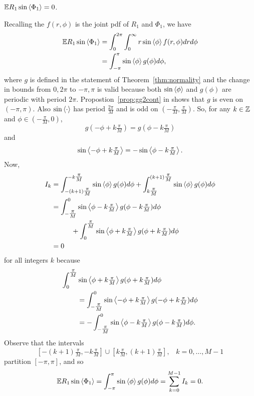 \documentclass[journal]{IEEEtran}
\begin{document}
\begin{lemma}\label{lem:expectImRfracpart}
${\mathbb E} R_1 \sin\left\langle \Phi_1 \right\rangle = 0$.
\end{lemma}
\begin{IEEEproof}
Recalling the $f(r,\phi)$ is the joint pdf of $R_1$ and $\Phi_1$, we have
\begin{align*}
{\mathbb E} R_1 \sin\left\langle \Phi_1 \right\rangle &= \int_{0}^{2\pi} \int_{0}^\infty r \sin\left\langle \phi \right\rangle f(r,\phi) dr d\phi \\
&= \int_{-\pi}^{\pi} \sin\left\langle \phi \right\rangle g(\phi) d\phi,
\end{align*}
where $g$ is defined in the statement of Theorem~\ref{thm:normality} and the change in bounds from $0, 2\pi$ to $-\pi,\pi$ is valid because both $\sin\left\langle \phi \right\rangle$ and $g(\phi)$ are periodic with period $2\pi$.  Propostion~\ref{prop:gg2cont} in \cite{McKilliam_leastsqPSKpilotsdata_2012} shows that $g$ is even on $(-\pi,\pi)$.  Also $\sin\left\langle \cdot \right\rangle$ has period $\tfrac{2\pi}{M}$ and is odd on $(-\frac{\pi}{M}, \tfrac{\pi}{M})$.  So, for any $k \in {\mathbb Z}$ and $\phi \in (-\tfrac{\pi}{M}, 0)$,
\[
g(-\phi + k \tfrac{\pi}{M}) = g(\phi - k \tfrac{\pi}{M})
\]
and
\[
\sin\left\langle -\phi + k \tfrac{\pi}{M} \right\rangle = -\sin\left\langle \phi - k \tfrac{\pi}{M} \right\rangle.
\]
Now,
\begin{align*}
I_k &= \int_{-(k+1)\tfrac{\pi}{M}}^{-k\tfrac{\pi}{M}}\sin\left\langle \phi \right\rangle g(\phi) d\phi + \int_{k\tfrac{\pi}{M}}^{(k+1)\tfrac{\pi}{M}}\sin\left\langle \phi \right\rangle g(\phi) d\phi \\
&= \int_{-\tfrac{\pi}{M}}^{0}\sin\left\langle \phi -  k\tfrac{\pi}{M} \right\rangle g(\phi - k\tfrac{\pi}{M}) d\phi \\
&\hspace{1cm}+ \int_{0}^{\tfrac{\pi}{M}}\sin\left\langle \phi + k\tfrac{\pi}{M} \right\rangle g(\phi + k\tfrac{\pi}{M}) d\phi \\
&= 0
\end{align*}
for all integers $k$ because
\begin{align*}
\int_{0}^{\tfrac{\pi}{M}}&\sin\left\langle \phi + k\tfrac{\pi}{M} \right\rangle g(\phi + k\tfrac{\pi}{M}) d\phi \\
&= \int_{-\tfrac{\pi}{M}}^{0}\sin\left\langle -\phi + k\tfrac{\pi}{M} \right\rangle g(-\phi + k\tfrac{\pi}{M}) d\phi \\
&= -\int_{-\tfrac{\pi}{M}}^{0}\sin\left\langle \phi - k\tfrac{\pi}{M} \right\rangle g(\phi - k\tfrac{\pi}{M}) d\phi.
\end{align*}
Observe that the intervals
\[
 [-(k+1)\tfrac{\pi}{M},-k\tfrac{\pi}{M}] \cup [k\tfrac{\pi}{M},(k+1)\tfrac{\pi}{M}], \;\;\; k = 0, \dots, M-1
\]
partition $[-\pi, \pi]$, and so
\[
{\mathbb E} R_1 \sin\left\langle \Phi_1 \right\rangle = \int_{-\pi}^{\pi} \sin\left\langle \phi \right\rangle g(\phi) d\phi = \sum_{k=0}^{M-1} I_k = 0.
\]
\end{IEEEproof}
\end{document}
